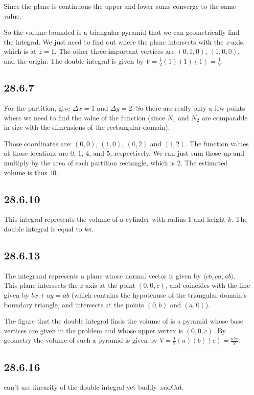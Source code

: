 \documentclass{article}
\begin{document}
Since the plane is continuous the upper and lower sums converge to the same value.

So the volume bounded is a triangular pyramid that we can geometrically find the integral. We just need to find out where the plane intersects with the $z$-axis, which is at $z=1$. The other three important vertices are $(0,1,0)$, $(1,0,0)$, and the origin. The double integral is given by $V = \frac{1}{2}(1)(1)(1) = \frac{1}{2}$.

\subsection{28.6.7}

For the partition, give $\Delta x = 1$ and $\Delta y = 2$. So there are really only a few points where we need to find the value of the function (since $N_1$ and $N_2$ are comparable in size with the dimensions of the rectangular domain). 

Those coordinates are: $(0,0)$, $(1,0)$, $(0,2)$ and $(1,2)$. The function values at those locations are $0$, $1$, $4$, and $5$, respectively. We can just sum those up and multiply by the area of each partition rectangle, which is $2$. The estimated volume is thus $10$.

\subsection{28.6.10}

This integral represents the volume of a cylinder with radius $1$ and height $k$. The double integral is equal to $k\pi$.

\subsection{28.6.13}

The integrand represents a plane whose normal vector is given by $\langle cb, ca, ab\rangle$. This plane intersects the $z$-axis at the point $(0,0,c)$, and coincides with the line given by $bx+ay=ab$ (which contains the hypotenuse of the triangular domain's boundary triangle, and intersects at the points $(0,b)$ and $(a,0)$).

The figure that the double integral finds the volume of is a pyramid whose base vertices are given in the problem and whose upper vertex is $(0,0,c)$. By geometry the volume of such a pyramid is given by $V = \frac{1}{2}(a)(b)(c) = \frac{abc}{2}$.

\subsection{28.6.16}

can't use linearity of the double integral yet buddy :sadCat:
\end{document}

